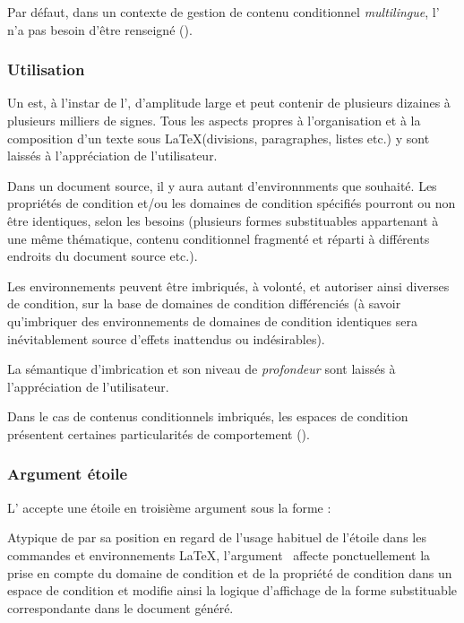 \documentclass{article}
\newcommand\Latex{\LaTeX\xspace} %
\begin{document}
Par défaut, dans un contexte de gestion de contenu conditionnel \emph{multilingue}, l' n'a pas besoin d'être renseigné ().

\subsubsection{Utilisation}\label{CtDoc_Commandes_CondiText_Utilisation}
Un  est, à l'instar de l', d'amplitude large et peut contenir de plusieurs dizaines à plusieurs milliers de signes. Tous les aspects propres à l'organisation et à la composition d'un texte sous \Latex (divisions, paragraphes, listes etc.) y sont laissés à l'appréciation de l'utilisateur.

Dans un document source, il y aura autant d'environnments  que souhaité. Les propriétés de condition et/ou les domaines de condition spécifiés pourront ou non être identiques, selon les besoins (plusieurs formes substituables appartenant à une même thématique, contenu conditionnel fragmenté et réparti à différents endroits du document source etc.).

Les environnements  peuvent être imbriqués, à volonté, et autoriser ainsi diverses  de condition, sur la base de domaines de condition différenciés (à savoir qu'imbriquer des environnements  de domaines de condition identiques sera inévitablement source d'effets inattendus ou indésirables).

La sémantique d'imbrication et son niveau de \emph{profondeur} sont laissés à l'appréciation de l'utilisateur.

Dans le cas de contenus conditionnels imbriqués, les espaces de condition présentent certaines particularités de comportement ().

\subsubsection{Argument étoile}\label{CtDoc_Commandes_CondiText_Etoile}
L' accepte une étoile en troisième argument sous la forme :


Atypique de par sa position en regard de l'usage habituel de l'étoile dans les commandes et environnements \Latex, l'argument~\val{*} affecte ponctuellement la prise en compte du domaine de condition et de la propriété de condition dans un espace de condition et modifie ainsi la logique d'affichage de la forme substituable correspondante dans le document généré.
\end{document}
